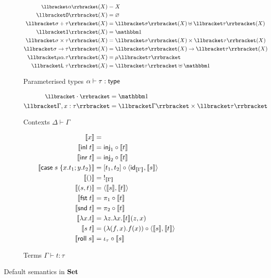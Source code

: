 \begin{figure}
\begin{subfigure}{\linewidth}
  \begin{align*}
  \small
  \sem{\alpha}(X) &= X
  \\
  \sem{\tyZero}(X) &= \varnothing
  \\
  \sem{\sigma \tySum \tau}(X) &= \sem{\sigma}(X) \uplus \sem{\tau}(X)
  \\
  \sem{\tyUnit}(X) &= \One
  \\
  \sem{\sigma \tyProd \tau}(X) &= \sem{\sigma}(X) \times \sem{\tau}(X)
  \\
  \sem{\sigma \tyFun \tau}(X) &= \sem{\sigma}(X) \to \sem{\tau}(X)
  \\
  \sem{\mu\alpha.\tau}(X) &= \mu\sem{\tau}
  \\
  \sem{\tyLift\;\tau}(X) &= \sem{\tau} \uplus \One
  \end{align*}
  \caption{Parameterised types $\alpha \vdash \tau: \mathsf{type}$}
  \label{fig:set-semantics:types}
\end{subfigure}
\begin{subfigure}{\linewidth}
  \begin{align*}
  \small
  \sem{\emptyCxt} &= \One
  \\
  \sem{\Gamma, x: \tau} &= \sem{\Gamma} \times \sem{\tau}
  \end{align*}
  \caption{Contexts $\Delta \vdash \Gamma$}
\end{subfigure}
\begin{subfigure}{\linewidth}
  \begin{align*}
  \small
  \llbracket x \rrbracket &=
  \\
  \llbracket \mathsf{inl}\;t \rrbracket &= \mathsf{inj}_1 \circ \llbracket t \rrbracket
  \\
  \llbracket \mathsf{inr}\;t \rrbracket &= \mathsf{inj}_2 \circ \llbracket t \rrbracket
  \\
  \llbracket \mathsf{case}\;s\;\{x.t_1; y.t_2\} \rrbracket &= [t_1, t_2] \circ \langle \mathsf{id}_{\llbracket \Gamma \rrbracket}, \llbracket s \rrbracket\rangle
  \\
  \llbracket () \rrbracket &=\;!_{\llbracket \Gamma \rrbracket}
  \\
  \llbracket (s,t) \rrbracket &= \langle \llbracket s \rrbracket, \llbracket t \rrbracket\rangle
  \\
  \llbracket \mathsf{fst}\;t \rrbracket &= \pi_1 \circ \llbracket t \rrbracket
  \\
  \llbracket \mathsf{snd}\;t \rrbracket &= \pi_2 \circ \llbracket t \rrbracket
  \\
  \llbracket \lambda x.t \rrbracket &= \lambda z.\lambda x.\llbracket t \rrbracket(z, x)
  \\
  \llbracket s\;t \rrbracket &= (\lambda (f, x).f(x)) \circ \langle \llbracket s \rrbracket, \llbracket t \rrbracket\rangle
  \\
  \llbracket \mathsf{roll}\;s \rrbracket &= \iota_{\tau} \circ \llbracket s \rrbracket
  \end{align*}
  \caption{Terms $\Gamma \vdash t: \tau$}
\end{subfigure}
\caption{Default semantics in $\mathbf{Set}$}
\end{figure}
